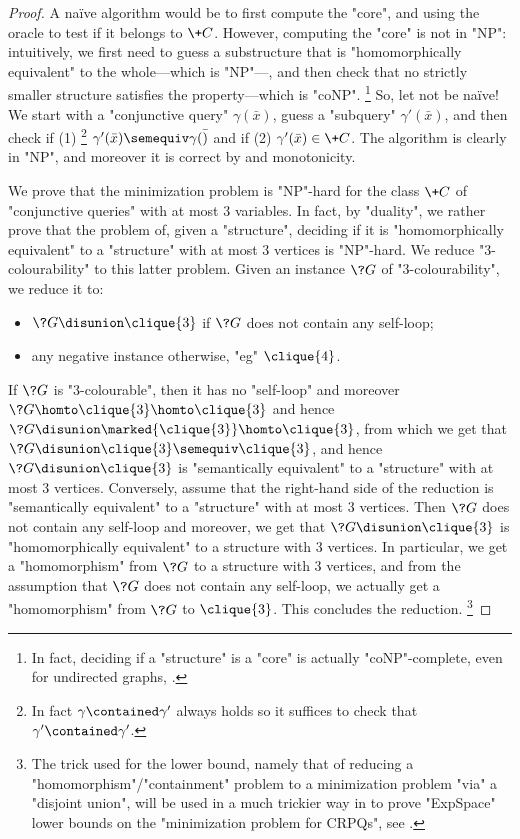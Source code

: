 \begin{proof}
	A naïve algorithm would be to first compute the "core", and using the oracle
	to test if it belongs to $\+C$.
	However, computing the "core" is not in "NP": intuitively,
	we first need to guess a substructure that is "homomorphically equivalent"
	to the whole---which is "NP"---,
	and then check that no strictly smaller structure satisfies the property---which is "coNP".%
	\footnote{In fact, deciding if a "structure" is a "core" is actually
	"coNP"-complete, even for undirected graphs, \cite[Theorem~7]{HellNesetril1992Core}.}
	So, let not be naïve! We start with a "conjunctive query"
	$\gamma(\bar x)$, guess a "subquery" $\gamma'(\bar x)$,
	and then check if (1)%
	\footnote{In fact $\gamma \contained \gamma'$ always holds so
	it suffices to check that $\gamma' \contained \gamma'$.}
	$\gamma'(\bar x) \semequiv \gamma(\bar)$ and
	if (2) $\gamma'(\bar x) \in \+C$.
	The algorithm is clearly in "NP", and moreover it is correct
	by  and monotonicity.

	 We prove that the minimization problem
	is "NP"-hard for the class $\+C$ of "conjunctive queries" with
	at most $3$ variables.
	In fact, by "duality", we rather prove that the problem
	of, given a "structure", deciding if it is "homomorphically equivalent"
	to a "structure" with at most $3$ vertices is "NP"-hard.
	We reduce "$3$-colourability" to this latter problem.
	Given an instance $\?G$ of "$3$-colourability", we reduce
	it to:
	\begin{itemize}
		\item $\?G \disunion \clique{3}$ if $\?G$ does not contain any self-loop;
		\item any negative instance otherwise, "eg" $\clique{4}$.
	\end{itemize}
	If $\?G$ is "$3$-colourable", then it has no "self-loop"
	and moreover $\?G \homto \clique{3} \homto \clique{3}$
	and hence $\?G \disunion \marked{\clique{3}} \homto \clique{3}$, 
	from which we get that $\?G \disunion \clique{3} \semequiv \clique{3}$,
	and hence $\?G \disunion \clique{3}$ is "semantically equivalent" to a "structure"
	with at most $3$ vertices.
	Conversely, assume that the right-hand side of the reduction is "semantically equivalent" to a 
	"structure" with at most $3$ vertices. Then $\?G$ does not contain any self-loop
	and moreover, we get that $\?G \disunion \clique{3}$ is "homomorphically equivalent"
	to a structure with 3 vertices.
	In particular, we get a "homomorphism" from $\?G$ to a structure with 3 vertices,
	and from the assumption that $\?G$ does not contain any self-loop,
	we actually get a "homomorphism" from $\?G$ to $\clique{3}$.
	This concludes the reduction.%
	\footnote{The trick used for the lower bound, 
	namely that of reducing a "homomorphism"/"containment" problem
	to a minimization problem "via" a "disjoint union", will be used in a
	much trickier way in 
	to prove "ExpSpace" lower bounds on the "minimization problem for CRPQs", 
	see \label{sec:minimization-lowerbounds,apdx-sec:lowerbound-variables}.}
\end{proof}

